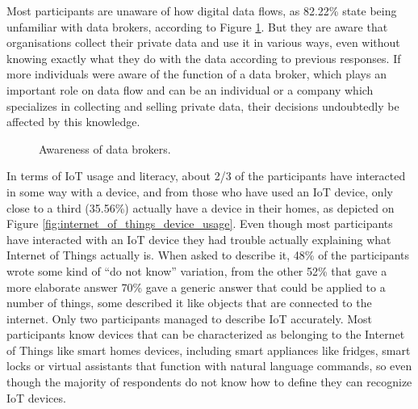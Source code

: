 Most participants are unaware of how digital data flows, as 82.22\% state
being unfamiliar with data brokers, according to Figure \ref{fig:aware_data_brokers}.
But they are aware that organisations collect their private data and use it
in various ways, even without knowing exactly what they do with the data
according to previous responses. If more individuals were aware of the function
of a data broker, which plays an important role on data flow and can be an individual
or a company which specializes in collecting and selling private data, their decisions
undoubtedly be affected by this knowledge.

\begin{figure}
    \centering
    \caption{Awareness of data brokers.}
    \label{fig:aware_data_brokers}
\end{figure}

In terms of IoT usage and literacy, about 2/3 of the participants have interacted in
some way with a device, and from those who have used an IoT device, only close
to a third (35.56\%) actually have a device in their homes, as depicted on
Figure \ref{fig:internet_of_things_device_usage}. Even though most participants
have interacted with an IoT device they had trouble actually explaining what Internet
of Things actually is. When asked to describe it, 48\% of the participants
wrote some kind of ``do not know'' variation, from the other 52\% that gave
a more elaborate answer 70\% gave a generic answer that could be applied to
a number of things, some described it like objects that are connected
to the internet. Only two participants managed to describe IoT accurately.
Most participants know devices that can be characterized as belonging to
the Internet of Things like smart homes devices, including smart
appliances like fridges, smart locks or virtual assistants that
function with natural language commands, so even though the majority
of respondents do not know how to define they can recognize IoT devices.

